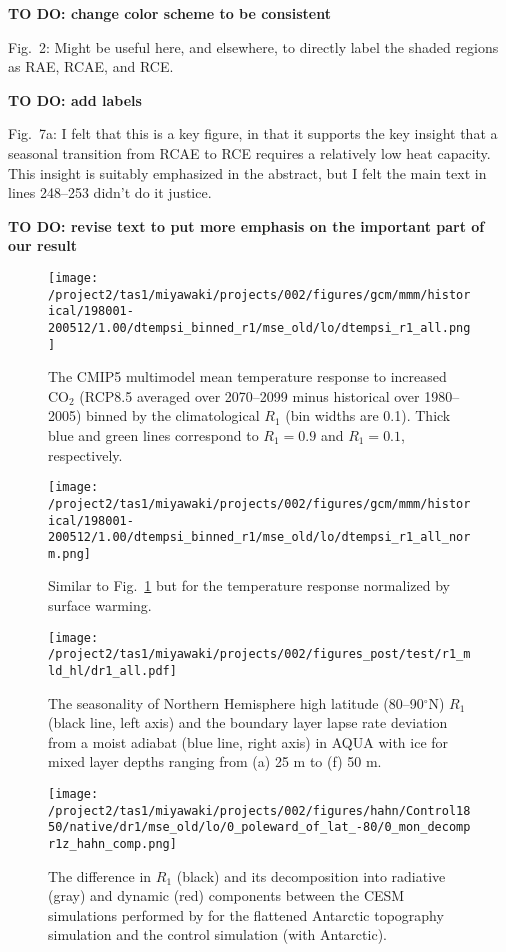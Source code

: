 \documentclass{article}
\begin{document}
{\color{red}\textbf{TO DO: change color scheme to be consistent}}

Fig.~2: Might be useful here, and elsewhere, to directly label the shaded regions as RAE, RCAE, and RCE.

{\color{red}\textbf{TO DO: add labels}}

Fig.~7a: I felt that this is a key figure, in that it supports the key insight that a seasonal transition from RCAE to RCE requires a relatively low heat capacity. This insight is suitably emphasized in the abstract, but I felt the main text in lines 248--253 didn't do it justice.

{\color{red}\textbf{TO DO: revise text to put more emphasis on the important part of our result}}

\begin{figure}[t]
  \noindent\texttt{[image: /project2/tas1/miyawaki/projects/002/figures/gcm/mmm/historical/198001-200512/1.00/dtempsi\_binned\_r1/mse\_old/lo/dtempsi\_r1\_all.png]}
  \caption{The CMIP5 multimodel mean temperature response to increased CO$_2$ (RCP8.5 averaged over 2070--2099 minus historical over 1980--2005) binned by the climatological $R_1$ (bin widths are 0.1). Thick blue and green lines correspond to $R_1=0.9$ and $R_1=0.1$, respectively.}
  \label{fig:binned-dt}
\end{figure}

\begin{figure}[t]
  \noindent\texttt{[image: /project2/tas1/miyawaki/projects/002/figures/gcm/mmm/historical/198001-200512/1.00/dtempsi\_binned\_r1/mse\_old/lo/dtempsi\_r1\_all\_norm.png]}
  \caption{Similar to Fig.~\ref{fig:binned-dt} but for the temperature response normalized by surface warming.}
  \label{fig:binned-dt-norm}
\end{figure}

\begin{figure}[t]
  \noindent\texttt{[image: /project2/tas1/miyawaki/projects/002/figures\_post/test/r1\_mld\_hl/dr1\_all.pdf]}
  \caption{The seasonality of Northern Hemisphere high latitude (80--90$^\circ$N) $R_1$ (black line, left axis) and the boundary layer lapse rate deviation from a moist adiabat (blue line, right axis) in AQUA with ice for mixed layer depths ranging from (a) 25 m to (f) 50 m.}
  \label{fig:r1-hl-mld}
\end{figure}

\begin{figure}[t]
  \noindent\texttt{[image: /project2/tas1/miyawaki/projects/002/figures/hahn/Control1850/native/dr1/mse\_old/lo/0\_poleward\_of\_lat\_-80/0\_mon\_decompr1z\_hahn\_comp.png]}
  \caption{The difference in $R_1$ (black) and its decomposition into radiative (gray) and dynamic (red) components between the CESM simulations performed by \citep{hahn2020} for the flattened Antarctic topography simulation and the control simulation (with Antarctic).}
  \label{fig:hahn-decomp}
\end{figure}
\end{document}
